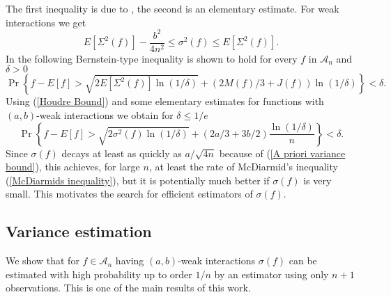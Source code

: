 \documentclass[final,12pt]{colt2018} %
\begin{document}
		The first inequality is due to \citet{Houdre 1997} \cite[see also][]{Maurer
			2017}, the second is an elementary estimate. For weak interactions we get 
		\begin{equation}
		E\left[ \Sigma ^{2}\left( f\right) \right] -\frac{b^{2}}{4n^{2}}\leq \sigma
		^{2}\left( f\right) \leq E\left[ \Sigma ^{2}\left( f\right) \right] .
		\label{Houdre Bound}
		\end{equation}%
		In \cite{Maurer 2017} the following Bernstein-type inequality is shown to
		hold for every $f$ in $\mathcal{A}_{n}$ and $\delta >0$%
		\begin{equation}
		\Pr \left\{ f-E\left[ f\right] >\sqrt{2E\left[ \Sigma ^{2}\left( f\right) %
			\right] \ln \left( 1/\delta \right) }+\left( 2M\left( f\right) /3+J\left(
		f\right) \right) \ln \left( 1/\delta \right) \right\} <\delta .
		\label{Bernstein inequality}
		\end{equation}%
		Using (\ref{Houdre Bound}) and some elementary estimates for functions with $%
		\left( a,b\right) $-weak interactions we obtain for $\delta \leq 1/e$%
		\begin{equation*}
		\Pr \left\{ f-E\left[ f\right] >\sqrt{2\sigma ^{2}\left( f\right) \ln \left(
			1/\delta \right) }+\left( 2a/3+3b/2\right) \frac{\ln \left( 1/\delta \right) 
		}{n}\right\} <\delta . 
		\end{equation*}%
		Since $\sigma \left( f\right) $ decays at least as quickly as $a/\sqrt{4n}$
		because of (\ref{A priori variance bound}), this achieves, for large $n$, at
		least the rate of McDiarmid's inequality (\ref{McDiarmids inequality}), but
		it is potentially much better if $\sigma \left( f\right) $ is very small.
		This motivates the search for efficient estimators of $\sigma \left(
		f\right) $.
		
		\subsection{Variance estimation\label{Subsection VarianceEstimation}}
		
		We show that for $f\in \mathcal{A}_{n}$ having $\left( a,b\right) $-weak
		interactions $\sigma \left( f\right) $ can be estimated with high
		probability up to order $1/n$ by an estimator using only $n+1$ observations.
		This is one of the main results of this work.
		
\end{document}

